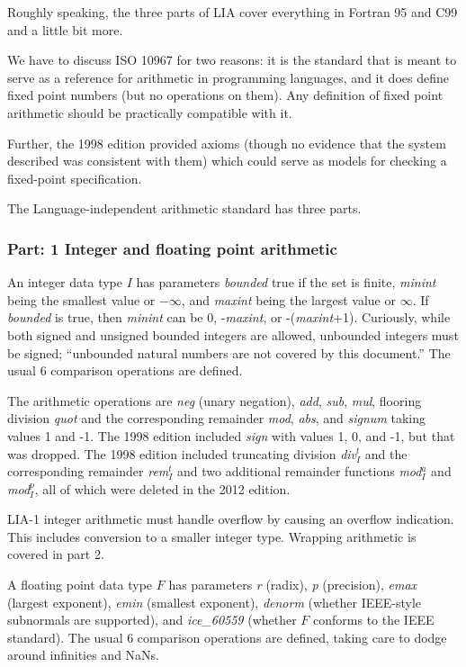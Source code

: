 \documentclass{article}
\begin{document}
Roughly speaking, the three parts of LIA cover everything
in Fortran 95 and C99 and a little bit more.

We have to discuss ISO 10967 for two reasons: it is the
standard that is meant to serve as a reference for arithmetic
in programming languages, and it does define fixed point
numbers (but no operations on them).  Any definition of
fixed point arithmetic should be practically compatible with it.

Further, the 1998 edition provided axioms (though no evidence
that the system described was consistent with them) which could
serve as models for checking a fixed-point specification.

The Language-independent arithmetic standard has three parts.

\subsubsection{Part: 1 Integer and floating point arithmetic}
An integer data type $I$ has parameters {\it bounded}\subI{}
true if the set is finite, {\it minint}\subI{} being the
smallest value or $-\infty$, and {\it maxint}\subI{} being the
largest value or $\infty$.  If {\it bounded}\subI{} is true,
then {\it minint}\subI{} can be 0, -{\it maxint}\subI{}, or
-({\it maxint}\subI{}+1).  Curiously, while both signed and
unsigned bounded integers are allowed, unbounded integers
must be signed; ``unbounded natural numbers are not covered
by this document.''  The usual 6 comparison operations are
defined.

The arithmetic operations are {\it neg}\subI{} (unary negation),
{\it add}\subI{}, {\it sub}\subI{}, {\it mul}\subI{},
flooring division {\it quot}\subI{} and the corresponding
remainder {\it mod}\subI{}, {\it abs}\subI{},
and {\it signum}\subI{} taking values 1 and -1.  The 1998 edition
included {\it sign}\subI{} with values 1, 0, and -1, but that was
dropped.  The 1998 edition included
truncating division {\it div}${}^t_I$ and the corresponding
remainder {\it rem}${}^t_I$ and two additional remainder functions
{\it mod}${}^a_I$ and {\it mod}${}^p_I$, all of which were deleted
in the 2012 edition.

LIA-1 integer arithmetic must handle overflow by causing
an overflow indication.  This includes conversion to a 
smaller integer type.  Wrapping arithmetic is covered in
part 2.

A floating point data type $F$ has parameters {\it r}\subF{}
(radix), {\it p}\subF{} (precision), {\it emax}\subF{} (largest
exponent), {\it emin}\subF{} (smallest exponent),
{\it denorm}\subF{} (whether IEEE-style subnormals are supported),
and {\it ice\_60559}\subF{} (whether $F$ conforms to the IEEE
standard).  The usual 6 comparison operations are defined,
taking care to dodge around infinities and NaNs.
\end{document}
